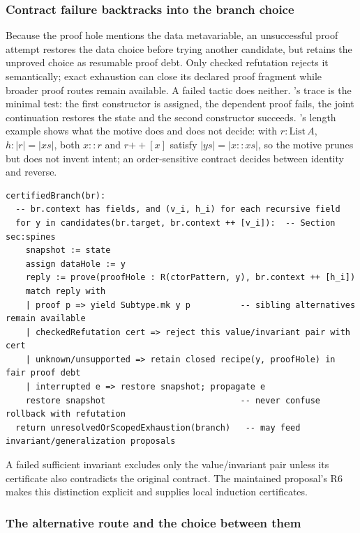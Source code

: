 \subsubsection{Contract failure backtracks into the branch choice}

Because the proof hole mentions the data metavariable, an unsuccessful proof attempt restores the data choice before trying another candidate, but retains the unproved choice as resumable proof debt. Only checked refutation rejects it semantically; exact exhaustion can close its declared proof fragment while broader proof routes remain available. A failed tactic does neither. 's  trace is the minimal test: the first constructor is assigned, the dependent proof fails, the joint continuation restores the state and the second constructor succeeds. 's length example shows what the motive does and does not decide: with $r : \mathrm{List}\,A$, $h : |r| = |xs|$, both $x{::}r$ and $r \mathbin{+\!\!+} [x]$ satisfy $|ys| = |x{::}xs|$, so the motive prunes but does not invent intent; an order-sensitive contract decides between identity and reverse.
\begin{lstlisting}
certifiedBranch(br):
  -- br.context has fields, and (v_i, h_i) for each recursive field
  for y in candidates(br.target, br.context ++ [v_i]):  -- Section sec:spines
    snapshot := state
    assign dataHole := y
    reply := prove(proofHole : R(ctorPattern, y), br.context ++ [h_i])
    match reply with
    | proof p => yield Subtype.mk y p          -- sibling alternatives remain available
    | checkedRefutation cert => reject this value/invariant pair with cert
    | unknown/unsupported => retain closed recipe(y, proofHole) in fair proof debt
    | interrupted e => restore snapshot; propagate e
    restore snapshot                           -- never confuse rollback with refutation
  return unresolvedOrScopedExhaustion(branch)   -- may feed invariant/generalization proposals
\end{lstlisting}

A failed sufficient invariant excludes only the value/invariant pair unless its certificate also contradicts the original contract. The maintained proposal's R6 makes this distinction explicit and supplies local induction certificates.

\subsubsection{The alternative route and the choice between them}

